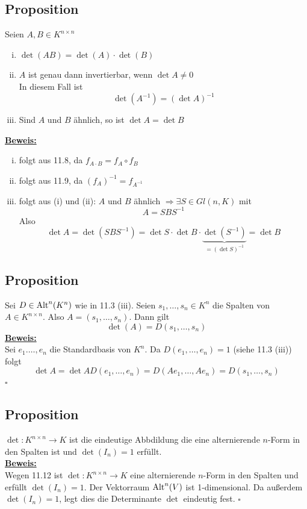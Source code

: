 \subsection{Proposition} %
\label{sub:proposition}
Seien $A,B \in K^{n \times n}$
\begin{enumerate}[(i)]
	\item $\det (AB)= \det (A) \cdot \det(B)$
	\item $A$ ist genau dann invertierbar, wenn $\det A \not= 0$ \\
	In diesem Fall ist
	\[
		\det (A ^{-1}) = ( \det A) ^{-1}
	\]
	\item Sind $A$ und $B$ ähnlich, so ist $\det A = \det B$
\end{enumerate}
\underline{\textbf{Beweis:}} \\
\begin{enumerate}[(i)]
	\item folgt aus 11.8, da $f_{A \cdot B} = f_A \circ f_B$
	\item folgt aus 11.9, da $(f_A) ^{-1} = f_{A ^{-1}}$
	\item folgt aus (i) und (ii): \quad $A$ und $B$ ähnlich $\Rightarrow \exists S \in Gl(n,K)$ mit
	\[
		A = S B S ^{-1}
	\] 
	Also
	\[
		\det A = \det ( SBS ^{-1}) = \det S \cdot \det B \cdot \underbrace{\det (S ^{-1})}_{= (\det S) ^{-1}} = \det B
	\]
\end{enumerate}


\subsection{Proposition} %
\label{sub:proposition}
Sei $D \in \operatorname{Alt}^n(K^n)$ wie in 11.3 (iii). Seien $s_1, \ldots , s_n \in K^n$ die Spalten von $A \in K^{n \times n}$. Also $	A= (s_1, \ldots , s_n)$.
Dann gilt 
\[
	\det (A) = D( s_1, \ldots , s_n)
\]
\underline{\textbf{Beweis:}} \\
Sei $e_1. \ldots , e_n$ die Standardbasis von $K^n$. Da $D(e_1, \ldots , e_n) = 1$ (siehe 11.3 (iii)) folgt 
\[
	\det A = \det A D(e_1, \ldots , e_n) = D(Ae_1 , \ldots , Ae_n) = D(s_1, \ldots , s_n)
\]
\hfill \( \square \)

\subsection{Proposition} %
\label{sub:proposition}
$\det : K^{n \times n} \to K$ ist die eindeutige Abbdildung die eine alternierende $n$-Form in den Spalten ist und $\det (I_n)=1$ erfüllt.
\vspace{\baselineskip} \\
\underline{\textbf{Beweis:}} \\
Wegen 11.12 ist $\det : K^{n \times n} \to K$ eine alternierende $n$-Form in den Spalten und erfüllt $\det (I_n)=1$. Der Vektorraum $\operatorname{Alt}^n(V)$ ist 1-dimensional.
Da außerdem $\det (I_n)=1$, legt dies die Determinante $\det$ eindeutig fest. \hfill \( \square \)

